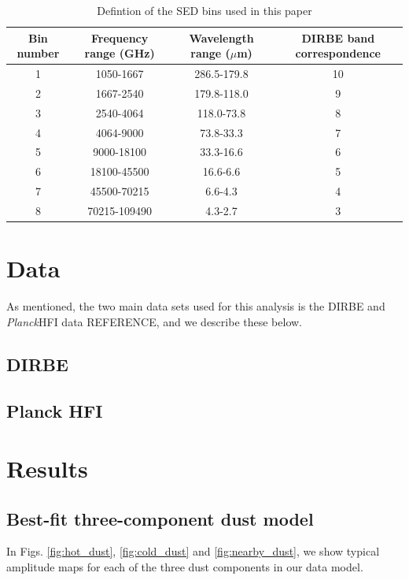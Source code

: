 \documentclass{aa}
\def\Planck{\textit{Planck}}
\begin{document}
\begin{table}
    \centering
    \caption{Defintion of the SED bins used in this paper}
    \begin{tabular}{c|c|c|c}
        \label{tab:bins}
        Bin number & Frequency range (GHz) & Wavelength range ($\mu$m) & DIRBE band correspondence \\
        \hline
        1 & 1050-1667 & 286.5-179.8 & 10 \\
        2 & 1667-2540 & 179.8-118.0 & 9 \\
        3 & 2540-4064 & 118.0-73.8 & 8 \\
        4 & 4064-9000 & 73.8-33.3 & 7 \\
        5 & 9000-18100 & 33.3-16.6 & 6 \\
        6 & 18100-45500 & 16.6-6.6 & 5  \\
        7 & 45500-70215 & 6.6-4.3 & 4 \\
        8 & 70215-109490 & 4.3-2.7 & 3
    \end{tabular}
\end{table}

\clearpage
\section{Data}
\label{sec:data}
As mentioned, the two main data sets used for this analysis is the DIRBE and \Planck HFI data REFERENCE, and we describe these below.
\subsection{DIRBE}

\subsection{Planck HFI}
\clearpage
\section{Results}

\subsection{Best-fit three-component dust model}
In Figs. \ref{fig:hot_dust}, \ref{fig:cold_dust} and \ref{fig:nearby_dust}, we show typical amplitude maps for each of the three dust components in our data model.
\end{document}
